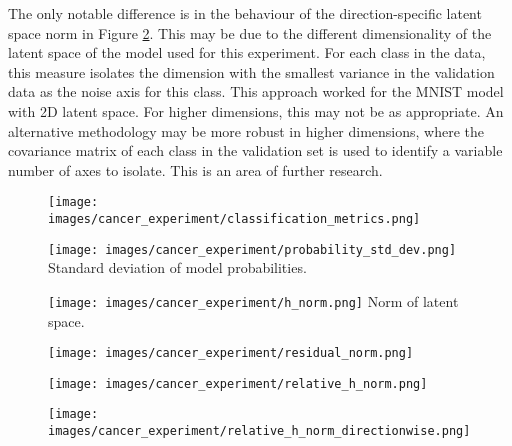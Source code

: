 \documentclass{article}
\begin{document}
The only notable difference is in the behaviour of the direction-specific latent space norm in Figure \ref{res:cancer relative h norm directionwise}. This may be due to the different dimensionality of the latent space of the model used for this experiment. For each class in the data, this measure isolates the dimension with the smallest variance in the validation data as the noise axis for this class. This approach worked for the MNIST model with 2D latent space. For higher dimensions, this may not be as appropriate. An alternative methodology may be more robust in higher dimensions, where the covariance matrix of each class in the validation set is used to identify a variable number of axes to isolate. This is an area of further research.



\begin{figure}[h]
\centering
\begin{minipage}{.25\textwidth}
  \centering
  \texttt{[image: images/cancer\_experiment/classification\_metrics.png]}
  \label{res:cancer accuracy}
\end{minipage}%
\hspace{.05\textwidth}
\begin{minipage}{.25\textwidth}
  \centering
  \texttt{[image: images/cancer\_experiment/probability\_std\_dev.png]}
  {Standard deviation of model probabilities.}
  \label{res:cancer prob std}
\end{minipage}
\begin{minipage}{.25\textwidth}
  \centering
  \texttt{[image: images/cancer\_experiment/h\_norm.png]}
  {Norm of latent space.}
  \label{res:cancer h norm}
\end{minipage}
\end{figure}


\begin{figure}[h]
\centering
\begin{minipage}{.25\textwidth}
  \centering
  \texttt{[image: images/cancer\_experiment/residual\_norm.png]}
  \label{res:cancer r norm}
\end{minipage}%
\hspace{.05\textwidth}
\begin{minipage}{.25\textwidth}
  \centering
  \texttt{[image: images/cancer\_experiment/relative\_h\_norm.png]}
  \label{res:cancer relative h norm}
\end{minipage}
\begin{minipage}{.25\textwidth}
  \centering
  \texttt{[image: images/cancer\_experiment/relative\_h\_norm\_directionwise.png]}
  \label{res:cancer relative h norm directionwise}
\end{minipage}
\end{figure}
\end{document}
